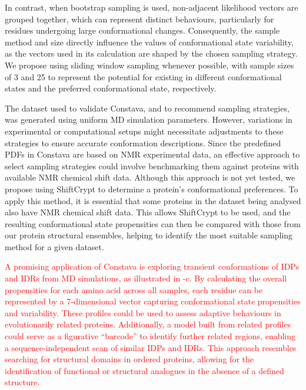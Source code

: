 In contrast, when bootstrap sampling is used, non-adjacent likelihood vectors are grouped together, which can represent distinct behaviours, particularly for residues undergoing large conformational changes. Consequently, the sample method and size directly influence the values of conformational state variability, as the vectors used in its calculation are shaped by the chosen sampling strategy. We propose using sliding window sampling whenever possible, with sample sizes of 3 and 25 to represent the potential for existing in different conformational states and the preferred conformational state, respectively.

The dataset used to validate Constava, and to recommend sampling strategies, was generated using uniform MD simulation parameters. However, variations in experimental or computational setups might necessitate adjustments to these strategies to ensure accurate conformation descriptions. Since the predefined PDFs in Constava are based on NMR experimental data, an effective approach to select sampling strategies could involve benchmarking them against proteins with available NMR chemical shift data. Although this approach is not yet tested, we propose using ShiftCrypt \cite{orlando_shiftcrypt_2020} to determine a protein's conformational preferences. To apply this method, it is essential that some proteins in the dataset being analysed also have NMR chemical shift data. This allows ShiftCrypt to be used, and the resulting conformational state propensities can then be compared with those from our protein structural ensembles, helping to identify the most suitable sampling method for a given dataset.


\textcolor{red}{A promising application of Constava is exploring transient conformations of IDPs and IDRs from MD simulations, as illustrated in -c. By calculating the overall propensities for each amino acid across all samples, each residue can be represented by a 7-dimensional vector capturing conformational state propensities and variability. These profiles could be used to assess adaptive behaviours in evolutionarily related proteins. Additionally, a model built from related profiles could serve as a figurative ``barcode'' to identify further related regions, enabling a sequence-independent scan of similar IDPs and IDRs. This approach resembles searching for structural domains in ordered proteins, allowing for the identification of functional or structural analogues in the absence of a defined structure.}

